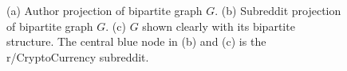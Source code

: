 \documentclass[twoside]{report}
\begin{document}
\begin{spacing}{1}
\begin{figure}[h]
\begin{minipage}{.5\linewidth}
\centering
{}
\end{minipage}%
\begin{minipage}{.5\linewidth}
\centering
{}
\end{minipage}\par\medskip
\centering
{}
\caption{(a) Author projection of bipartite graph $G$. (b) Subreddit projection of bipartite graph $G$. (c) $G$ shown clearly with its bipartite structure. The central blue node in (b) and (c) is the r/CryptoCurrency subreddit.}
\label{fig:bipartite}
\end{figure}



\end{spacing}
\end{document}

